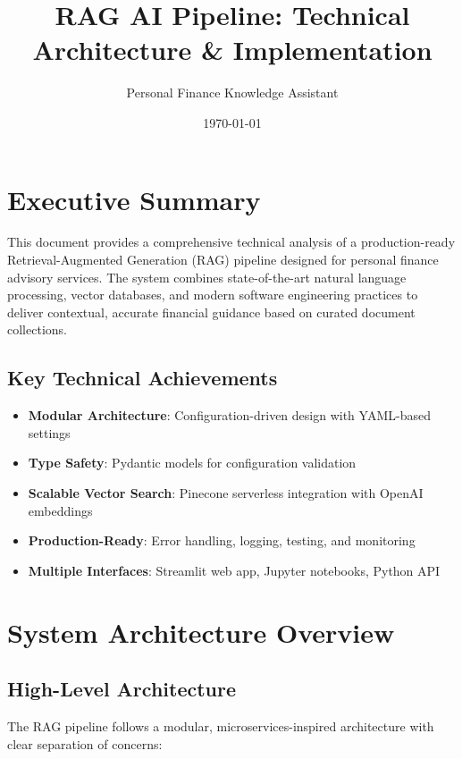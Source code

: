 \documentclass[12pt,a4paper]{article}
\title{\textbf{RAG AI Pipeline: Technical Architecture \& Implementation}}
\author{Personal Finance Knowledge Assistant}
\date{\today}
\begin{document}
\maketitle

\tableofcontents
\newpage

\section{Executive Summary}

This document provides a comprehensive technical analysis of a production-ready Retrieval-Augmented Generation (RAG) pipeline designed for personal finance advisory services. The system combines state-of-the-art natural language processing, vector databases, and modern software engineering practices to deliver contextual, accurate financial guidance based on curated document collections.

\subsection{Key Technical Achievements}
\begin{itemize}
    \item \textbf{Modular Architecture}: Configuration-driven design with YAML-based settings
    \item \textbf{Type Safety}: Pydantic models for configuration validation
    \item \textbf{Scalable Vector Search}: Pinecone serverless integration with OpenAI embeddings
    \item \textbf{Production-Ready}: Error handling, logging, testing, and monitoring
    \item \textbf{Multiple Interfaces}: Streamlit web app, Jupyter notebooks, Python API
\end{itemize}

\section{System Architecture Overview}

\subsection{High-Level Architecture}

The RAG pipeline follows a modular, microservices-inspired architecture with clear separation of concerns:
\end{document}
